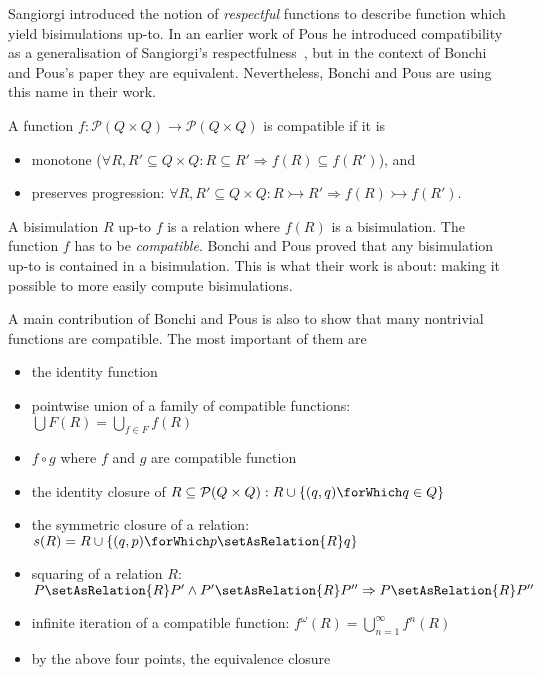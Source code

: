 Sangiorgi introduced the notion of \textit{respectful} functions to describe
function which yield bisimulations up-to.
In an earlier work of Pous he introduced compatibility as a generalisation of
Sangiorgi's respectfulness~\cite{pous2007complete}, but in the context of Bonchi and Pous's paper they
are equivalent. Nevertheless, Bonchi and Pous are using this name in their work.

\begin{definition}
  A function $f : \mathcal{P}(Q \times Q) \to \mathcal{P}(Q \times Q)$ is compatible if it is
  \begin{itemize}
    \item monotone ($\forall R, R' \subseteq Q \times Q: R \subseteq R' \Rightarrow f(R) \subseteq f(R')$), and
    \item preserves progression:
        $\forall R, R' \subseteq Q \times Q: R \rightarrowtail R' \Rightarrow f(R) \rightarrowtail f(R')$.
  \end{itemize}
\end{definition}

A bisimulation $R$ up-to $f$ is a relation where $f(R)$ is a bisimulation.
The function $f$ has to be \textit{compatible}. Bonchi and Pous proved that
any bisimulation up-to is contained in a bisimulation. This is what their
work is about: making it possible to more easily compute bisimulations.

A main contribution of Bonchi and Pous is also to show that many nontrivial functions
are compatible. The most important of them are

\begin{itemize}
  \item the identity function
  \item pointwise union of a family of compatible functions: \\
          $\bigcup F(R) = \bigcup_{f \in F} f(R)$
  \item $f \circ g$ where $f$ and $g$ are compatible function
  \item the identity closure of $R \subseteq \mathcal{P}(Q \times Q): R \cup \{(q, q)\forWhich q \in Q\}$
  \item the symmetric closure of a relation: $s(R) = R \cup \{(q, p) \forWhich p \setAsRelation{R} q\}$
  \item squaring of a relation $R$: $P \setAsRelation{R} P' \land P' \setAsRelation{R} P'' \Rightarrow P \setAsRelation{R} P''$
  \item infinite iteration of a compatible function: $f^\omega(R) = \bigcup_{n = 1}^{\infty} f^n(R)$
  \item by the above four points, the equivalence closure
\end{itemize}

